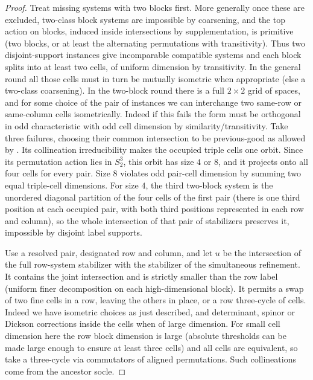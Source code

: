 \begin{proof}

Treat missing systems with two blocks first. More generally once these are excluded, two-class block
systems are impossible by coarsening, and the top action on blocks, induced inside intersections by
supplementation, is primitive (two blocks, or at least the alternating permutations with transitivity).
Thus two disjoint-support instances give incomparable compatible systems and each block splits into at
least two cells, of uniform dimension by transitivity. In the general round all those cells must in turn
be mutually isometric when appropriate (else a two-class coarsening). In the two-block round there is a
full \(2\times2\) grid of spaces, and for some choice of the pair of instances we can interchange two
same-row or same-column cells isometrically. Indeed if this fails the form must be orthogonal in odd
characteristic with odd cell dimension by similarity/transitivity. Take three failures, choosing their
common intersection to be previous-good as allowed by .  Its collineation
irreducibility makes the occupied triple cells one orbit.  Since its permutation action lies in
\(S_2^3\), this orbit has size \(4\) or \(8\), and it projects onto all four cells for every pair. Size 8
violates odd pair-cell dimension by summing two equal triple-cell
dimensions. For size \(4\), the third two-block system is the unordered diagonal partition of the four cells of the first pair
(there is one third position at each occupied pair, with both third positions represented in each row and
column), so the whole intersection of that pair of stabilizers preserves it, impossible by disjoint label
supports.

Use a resolved pair, designated row and column, and let \(u\) be the intersection of the full row-system
stabilizer with the stabilizer of the simultaneous refinement. It contains the joint intersection and is
strictly smaller than the row label (uniform finer decomposition on each high-dimensional block). It
permits a swap of two fine cells in a row, leaving the others in place, or a row three-cycle of cells.
Indeed we have isometric choices as just described, and determinant, spinor or Dickson corrections inside
the cells when of large dimension. For small cell dimension here the row block dimension is large
(absolute thresholds can be made large enough to ensure at least three cells) and all cells are
equivalent, so take a three-cycle via commutators of aligned permutations. Such collineations come from
the ancestor socle.


\end{proof}
